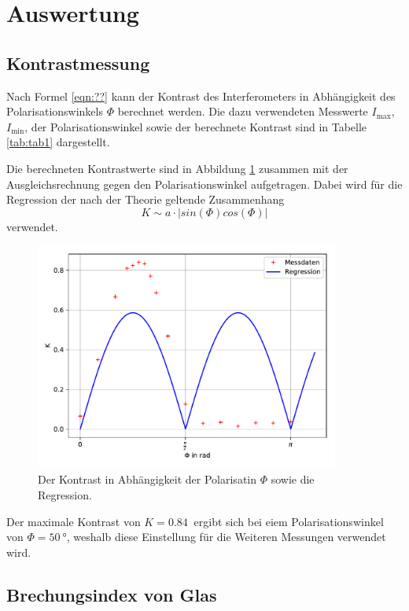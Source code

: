 \section{Auswertung}
\subsection{Kontrastmessung}

Nach Formel \ref{eqn:??} kann der Kontrast des Interferometers in Abhängigkeit des Polarisationswinkels $\Phi$
berechnet werden. Die dazu verwendeten Messwerte $I_{\text{max}}$, $I_{\text{min}}$, der Polarisationswinkel sowie
der berechnete Kontrast sind in Tabelle \ref{tab:tab1} dargestellt.



Die berechneten Kontrastwerte sind in Abbildung \ref{fig:Kontrast} zusammen mit der Ausgleichsrechnung
gegen den Polarisationswinkel aufgetragen. Dabei wird für die Regression der nach der Theorie geltende Zusammenhang
\begin{equation}
  K\sim a\cdot|sin(\Phi)cos(\Phi)|
\end{equation}
verwendet.

\begin{figure}[H]
  \centering
  \includegraphics[width=10cm]{Kontrast.png}
  \caption{Der Kontrast in Abhängigkeit der Polarisatin $\Phi$ sowie die Regression.}
  \label{fig:Kontrast}
\end{figure}

Der maximale Kontrast von $K=\SI{0,84}{}$ ergibt sich bei eiem Polarisationswinkel von $\Phi=\SI{50}{\degree}$,
weshalb diese Einstellung für die Weiteren Messungen verwendet wird.

\subsection{Brechungsindex von Glas}

